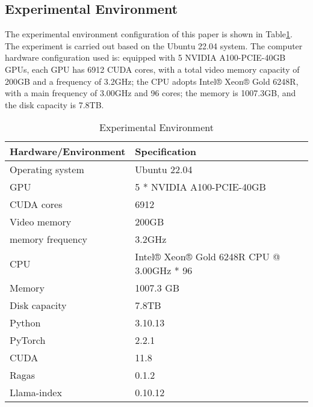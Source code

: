 

\subsection{Experimental Environment} %
The experimental environment configuration of this paper is shown in Table\ref{tab:tab4}. The experiment is carried out based on the Ubuntu 22.04 system. The computer hardware configuration used is: equipped with 5 NVIDIA A100-PCIE-40GB GPUs, each GPU has 6912 CUDA cores, with a total video memory capacity of 200GB and a frequency of 3.2GHz; the CPU adopts Intel® Xeon® Gold 6248R, with a main frequency of 3.00GHz and 96 cores; the memory is 1007.3GB, and the disk capacity is 7.8TB.

\begin{table}
\caption{Experimental Environment}
\centering
\begin{tabular}{p{}p{}}
\toprule[0.8pt]
Hardware/Environment & Specification \\
\hline
Operating system & Ubuntu 22.04 \\
GPU & 5 * NVIDIA A100-PCIE-40GB \\
CUDA cores & 6912 \\
Video memory & 200GB \\
memory frequency & 3.2GHz \\
CPU & Intel® Xeon® Gold 6248R CPU @ 3.00GHz * 96 \\
Memory & 1007.3 GB \\
Disk capacity & 7.8TB \\
Python & 3.10.13 \\
PyTorch & 2.2.1 \\
CUDA & 11.8 \\
Ragas & 0.1.2 \\
Llama-index & 0.10.12 \\
\bottomrule[0.8pt]
\end{tabular}
\label{tab:tab4}
\end{table}

